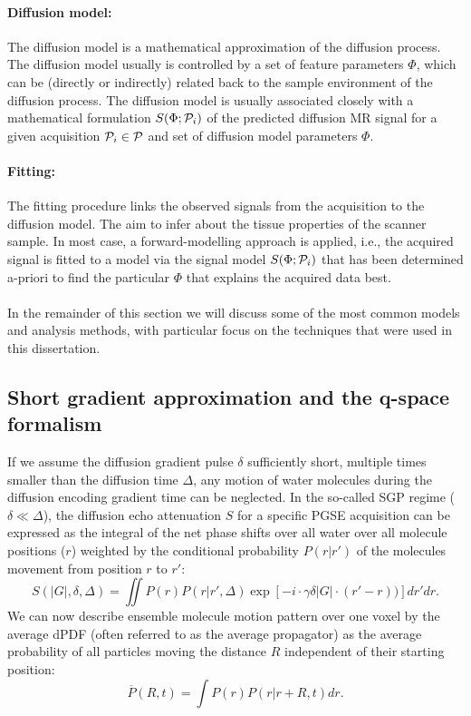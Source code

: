 \paragraph{Diffusion model:} The diffusion model is a mathematical approximation of the diffusion process. The diffusion model usually is controlled by a set of feature parameters $\Phi$, which can be (directly or indirectly) related back to the sample environment of the diffusion process. The diffusion model is usually associated closely with a mathematical formulation $S(\Phi;\mathcal{P}_i)$ of the predicted diffusion MR signal for a given acquisition $\mathcal{P}_i \in \mathcal{P}$ and set of diffusion model parameters $\Phi$.
\paragraph{Fitting:} The fitting procedure links the observed signals from the acquisition to the diffusion model. The aim to infer about the tissue properties of the scanner sample. In most case, a forward-modelling approach is applied, i.e., the acquired signal is fitted to a model via the signal model $S(\Phi;\mathcal{P}_i)$ that has been determined a-priori to find the particular $\Phi$ that explains the acquired data best.  
\paragraph{}
In the remainder of this section we will discuss some of the most common models and analysis methods, with particular focus on the techniques that were used in this dissertation. 
\subsection{Short gradient approximation and the q-space formalism}
If we assume the diffusion gradient pulse $\delta$ sufficiently short, multiple times smaller than the diffusion time $\Delta$, any motion of water molecules during the diffusion encoding gradient time can be neglected. In the so-called \gls{SGP} regime ($\delta \ll \Delta$), the diffusion echo attenuation $S$ for a specific PGSE acquisition can be expressed as the integral of the net phase shifts over all water over all molecule positions ($r$) weighted by the conditional probability $P(r|r')$ of the molecules movement from position $r$ to $r'$\citep{Callaghan:1991}:
\begin{equation}
	S(|G|,\delta,\Delta)=\iint P(r)P(r|r',\Delta)\exp[-i\cdot \gamma \delta |G|\cdot (r'-r))] dr'dr.
	\label{eq:chapter2 signal in sgp}
\end{equation}
We can now describe ensemble molecule motion pattern over one voxel by the average \gls{dPDF} (often referred to as the average propagator\citep{Kaerger:1983}) as the average probability of all particles moving the distance $R$ independent of their starting position:
\begin{equation}
	\overline{P}(R,t)=\int P(r)P(r|r+R,t)dr.
	\label{eq:chapter2 dpdf}
\end{equation}

